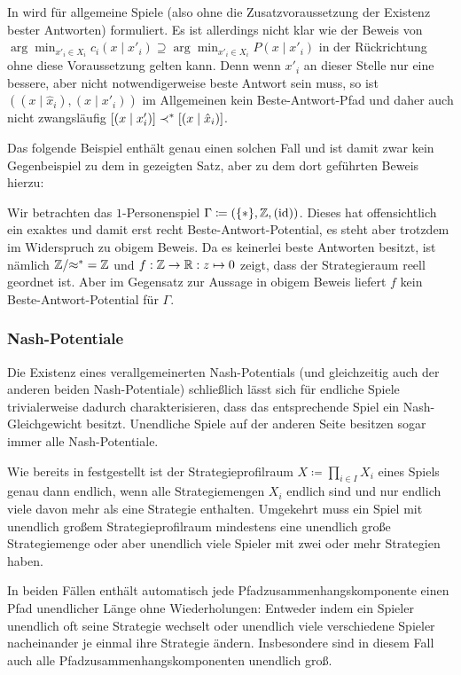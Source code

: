 \begin{bem}
	In \cite{BestRespPot} wird  für allgemeine Spiele (also ohne die Zusatzvoraussetzung der Existenz bester Antworten) formuliert. Es ist allerdings nicht klar wie der Beweis von $\arg \min_{x'_i \in X_i}c_i(x \mid x'_i) \supseteq \arg \min_{x'_i \in X_i} P(x \mid x'_i)$ in der Rückrichtung ohne diese Voraussetzung gelten kann. Denn wenn $x'_i$ an dieser Stelle nur eine bessere, aber nicht notwendigerweise beste Antwort sein muss, so ist $((x \mid \hat{x}_i), (x \mid x'_i))$ im Allgemeinen kein Beste-Antwort-Pfad und daher auch nicht zwangsläufig $[(x \mid x'_i)] \prec^\ast [(x \mid \hat{x}_i)]$.
\end{bem}
Das folgende Beispiel enthält genau einen solchen Fall und ist damit zwar kein Gegenbeispiel zu dem in \cite{BestRespPot} gezeigten Satz, aber zu dem dort geführten Beweis hierzu:

\begin{bsp}
	Wir betrachten das $1$-Personenspiel $\Gamma \coloneqq (\{\ast\}, \mathbb{Z}, (\mathrm{id}))$. Dieses hat offensichtlich ein exaktes und damit erst recht Beste-Antwort-Potential, es steht aber trotzdem im Widerspruch zu obigem Beweis. Da es keinerlei beste Antworten besitzt, ist nämlich $\mathbb{Z}/{\approx^\ast} = \mathbb{Z}$ und $f: \mathbb{Z} \to \mathbb{R}: z \mapsto 0$ zeigt, dass der Strategieraum reell geordnet ist. Aber im Gegensatz zur Aussage in obigem Beweis liefert $f$ kein Beste-Antwort-Potential für $\Gamma$.
\end{bsp}


\subsubsection{Nash-Potentiale}

Die Existenz eines verallgemeinerten Nash-Potentials (und gleichzeitig auch der anderen beiden Nash-Potentiale) schließlich lässt sich für endliche Spiele trivialerweise dadurch charakterisieren, dass das entsprechende Spiel ein Nash-Gleichgewicht besitzt. Unendliche Spiele auf der anderen Seite besitzen sogar immer alle Nash-Potentiale.

\begin{beob}\label{beob:UnendlichePfadzshkomp}
	Wie bereits in  festgestellt ist der Strategieprofilraum $X \coloneqq \prod_{i \in I}X_i$ eines Spiels genau dann endlich, wenn alle Strategiemengen $X_i$ endlich sind und nur endlich viele davon mehr als eine Strategie enthalten. Umgekehrt muss ein Spiel mit unendlich großem Strategieprofilraum mindestens eine unendlich große Strategiemenge oder aber unendlich viele Spieler mit zwei oder mehr Strategien haben.
	
	In beiden Fällen enthält automatisch jede Pfadzusammenhangskomponente einen Pfad unendlicher Länge ohne Wiederholungen: Entweder indem ein Spieler unendlich oft seine Strategie wechselt oder unendlich viele verschiedene Spieler nacheinander je einmal ihre Strategie ändern. Insbesondere sind in diesem Fall auch alle Pfadzusammenhangskomponenten unendlich groß.
\end{beob}

